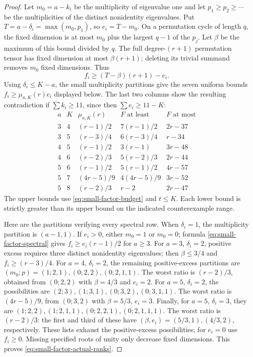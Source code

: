 \documentclass[11pt]{article}
\theoremstyle{definition}
\theoremstyle{remark}
\begin{document}
\begin{proof}
Let $m_0=a-k_i$ be the multiplicity of eigenvalue one and
let $p_1\geq p_2\geq\cdots$ be the multiplicities of the
distinct nonidentity eigenvalues.  Put
$T=a-\delta_i=\max(m_0,p_1)$, so $e_i=T-m_0$.
On a permutation cycle of length $q$, the fixed dimension is
at most $m_0$ plus the largest $q-1$ of the $p_j$.
Let $\beta$ be the maximum of this bound divided by $q$.
The full degree-$(r+1)$ permutation tensor has fixed
dimension at most $\beta(r+1)$; deleting its trivial summand
removes $m_0$ fixed dimensions.  Thus
\begin{equation}\label{eq:small-factor-spectral}
                         f_i\geq(T-\beta)(r+1)-e_i.
\end{equation}
Using $\delta_i\leq K-a$, the small multiplicity partitions
give the seven uniform bounds $f_i\geq\mu_{a,K}(r)e_i$
displayed below.  The last two columns show the resulting
contradiction if $\sum k_i\geq11$, since then
$\sum e_i\geq11-K$:
\[
\begin{array}{c|c|c|c|c}
 a&K&\mu_{a,K}(r)&F\text{ at least}&F\text{ at most}\\ \hline
 3&4&(r-1)/2&7(r-1)/2&2r-37\\
 3&5&(r-3)/4&6(r-3)/4&r-34\\
 4&5&(r-1)/2&3(r-1)&3r-48\\
 4&6&(r-2)/3&5(r-2)/3&2r-44\\
 5&6&(r-1)/2&5(r-1)/2&4r-57\\
 5&7&(4r-5)/9&4(4r-5)/9&3r-52\\
 5&8&(r-2)/3&r-2&2r-47
\end{array}
\]
The upper bounds use \eqref{eq:small-factor-budget} and
$t\leq K$.  Each lower bound is strictly greater than its
upper bound on the indicated counterexample range.

Here are the partitions verifying every spectral row.
When $\delta_i=1$, the multiplicity partition is $(a-1,1)$.
If $e_i>0$, either $m_0=1$ or $m_0=0$; formula
\eqref{eq:small-factor-spectral} gives
$f_i\geq e_i(r-1)/2$ for $a\geq3$.
For $a=3$, $\delta_i=2$, positive excess requires three
distinct nonidentity eigenvalues; then $\beta\leq3/4$ and
$f_i\geq(r-3)/4$.
For $a=4$, $\delta_i=2$, the remaining positive-excess
partitions are
$(m_0;p)=(1;2,1),(0;2,2),(0;2,1,1)$.
The worst ratio is $(r-2)/3$, obtained from
$(0;2,2)$ with $\beta=4/3$ and $e_i=2$.
For $a=5$, $\delta_i=2$, the possibilities are
$(2;3),(1;3,1),(0;3,2),(0;3,1,1)$.
The worst ratio is $(4r-5)/9$, from $(0;3,2)$ with
$\beta=5/3$, $e_i=3$.
Finally, for $a=5$, $\delta_i=3$, they are
$(1;2,2),(1;2,1,1),(0;2,2,1),(0;2,1,1,1)$.
The worst ratio is $(r-2)/3$: the first and third of these
have $(\beta,e_i)=(5/3,1),(4/3,2)$, respectively.
These lists exhaust the positive-excess possibilities;
for $e_i=0$ use $f_i\geq0$.
Missing specified roots of unity only decrease fixed dimensions.
This proves \eqref{eq:small-factor-actual-ranks}.


\end{proof}
\end{document}
